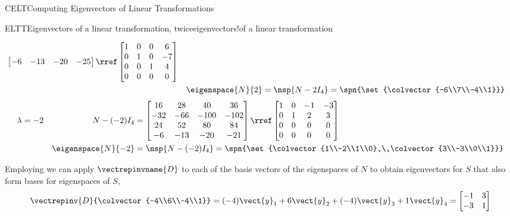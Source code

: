 \begin{subsect}{CELT}{Computing Eigenvectors of Linear Transformations}
\begin{example}{ELTT}{Eigenvectors of a linear transformation, twice}{eigenvectors!of a linear transformation}
\begin{para}
\begin{align*}
\begin{bmatrix}
 -6 & -13 & -20 & -25
\end{bmatrix}
\rref
\begin{bmatrix}
 1 & 0 & 0 & 6 \\
 0 & 1 & 0 & -7 \\
 0 & 0 & 1 & 4 \\
 0 & 0 & 0 & 0
\end{bmatrix}\\
&&\eigenspace{N}{2}&=\nsp{N-2I_4}
=\spn{\set{\colvector{-6\\7\\-4\\1}}}
\end{align*}
%
\begin{align*}
\lambda&=-2&N-(-2)I_4&=
\begin{bmatrix}
 16 & 28 & 40 & 36 \\
 -32 & -66 & -100 & -102 \\
 24 & 52 & 80 & 84 \\
 -6 & -13 & -20 & -21
\end{bmatrix}
\rref
\begin{bmatrix}
 1 & 0 & -1 & -3 \\
 0 & 1 & 2 & 3 \\
 0 & 0 & 0 & 0 \\
 0 & 0 & 0 & 0
\end{bmatrix}\\
&&\eigenspace{N}{-2}&=\nsp{N-(-2)I_4}
=\spn{\set{\colvector{1\\-2\\1\\0},\,\colvector{3\\-3\\0\\1}}}
\end{align*}
\end{para}
%
\begin{para}Employing  we can apply $\vectrepinvname{D}$ to each of the basis vectors of the eigenspaces of $N$ to obtain eigenvectors for $S$ that also form bases for eigenspaces of $S$,
%
\begin{align*}
\vectrepinv{D}{\colvector{-4\\6\\-4\\1}}
&=
(-4)\vect{y}_1+6\vect{y}_2+(-4)\vect{y}_3+1\vect{y}_4=
\begin{bmatrix}-1 & 3\\-3 & 1\end{bmatrix}\\

\end{align*}
\end{para}
\end{example}
\end{subsect}
